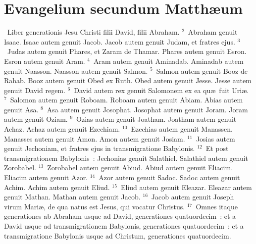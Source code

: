 {\centering \section*{Evangelium secundum Matthæum}}\thispagestyle{empty}

~Liber generationis Jesu Christi filii David, filii Abraham.
${}^{2}$~Abraham genuit Isaac. Isaac autem genuit Jacob. Jacob autem genuit Judam, et fratres ejus.
${}^{3}$~Judas autem genuit Phares, et Zaram de Thamar. Phares autem genuit Esron. Esron autem genuit Aram.
${}^{4}$~Aram autem genuit Aminadab. Aminadab autem genuit Naasson. Naasson autem genuit Salmon.
${}^{5}$~Salmon autem genuit Booz de Rahab. Booz autem genuit Obed ex Ruth. Obed autem genuit Jesse. Jesse autem genuit David regem.
${}^{6}$~David autem rex genuit Salomonem ex ea qu\ae\ fuit Uri\ae .
${}^{7}$~Salomon autem genuit Roboam. Roboam autem genuit Abiam. Abias autem genuit Asa.
${}^{8}$~Asa autem genuit Josophat. Josophat autem genuit Joram. Joram autem genuit Oziam.
${}^{9}$~Ozias autem genuit Joatham. Joatham autem genuit Achaz. Achaz autem genuit Ezechiam.
${}^{10}$~Ezechias autem genuit Manassen. Manasses autem genuit Amon. Amon autem genuit Josiam.
${}^{11}$~Josias autem genuit Jechoniam, et fratres ejus in transmigratione Babylonis.
${}^{12}$~Et post transmigrationem Babylonis~: Jechonias genuit Salathiel. Salathiel autem genuit Zorobabel.
${}^{13}$~Zorobabel autem genuit Abiud. Abiud autem genuit Eliacim. Eliacim autem genuit Azor.
${}^{14}$~Azor autem genuit Sadoc. Sadoc autem genuit Achim. Achim autem genuit Eliud.
${}^{15}$~Eliud autem genuit Eleazar. Eleazar autem genuit Mathan. Mathan autem genuit Jacob.
${}^{16}$~Jacob autem genuit Joseph virum Mari\ae , de qua natus est Jesus, qui vocatur Christus.
${}^{17}$~Omnes itaque generationes ab Abraham usque ad David, generationes quatuordecim~: et a David usque ad transmigrationem Babylonis, generationes quatuordecim~: et a transmigratione Babylonis usque ad Christum, generationes quatuordecim.


